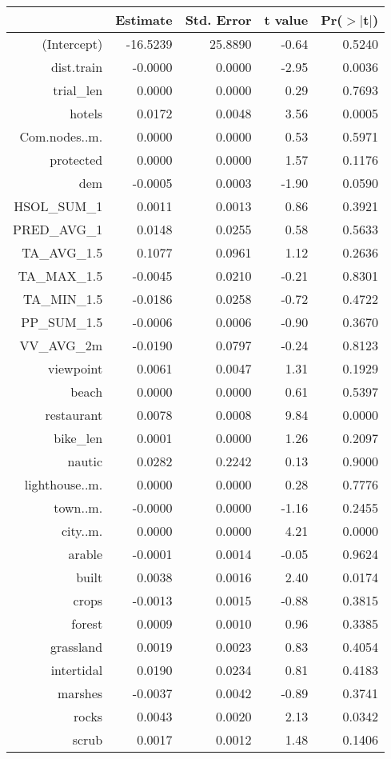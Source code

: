\begin{table}[ht]
\centering
\begin{tabular}{rrrrr}
  \hline
 & Estimate & Std. Error & t value & Pr($>$$|$t$|$) \\ 
  \hline
(Intercept) & -16.5239 & 25.8890 & -0.64 & 0.5240 \\ 
  dist.train & -0.0000 & 0.0000 & -2.95 & 0.0036 \\ 
  trial\_len & 0.0000 & 0.0000 & 0.29 & 0.7693 \\ 
  hotels & 0.0172 & 0.0048 & 3.56 & 0.0005 \\ 
  Com.nodes..m. & 0.0000 & 0.0000 & 0.53 & 0.5971 \\ 
  protected & 0.0000 & 0.0000 & 1.57 & 0.1176 \\ 
  dem & -0.0005 & 0.0003 & -1.90 & 0.0590 \\ 
  HSOL\_SUM\_1 & 0.0011 & 0.0013 & 0.86 & 0.3921 \\ 
  PRED\_AVG\_1 & 0.0148 & 0.0255 & 0.58 & 0.5633 \\ 
  TA\_AVG\_1.5 & 0.1077 & 0.0961 & 1.12 & 0.2636 \\ 
  TA\_MAX\_1.5 & -0.0045 & 0.0210 & -0.21 & 0.8301 \\ 
  TA\_MIN\_1.5 & -0.0186 & 0.0258 & -0.72 & 0.4722 \\ 
  PP\_SUM\_1.5 & -0.0006 & 0.0006 & -0.90 & 0.3670 \\ 
  VV\_AVG\_2m & -0.0190 & 0.0797 & -0.24 & 0.8123 \\ 
  viewpoint & 0.0061 & 0.0047 & 1.31 & 0.1929 \\ 
  beach & 0.0000 & 0.0000 & 0.61 & 0.5397 \\ 
  restaurant & 0.0078 & 0.0008 & 9.84 & 0.0000 \\ 
  bike\_len & 0.0001 & 0.0000 & 1.26 & 0.2097 \\ 
  nautic & 0.0282 & 0.2242 & 0.13 & 0.9000 \\ 
  lighthouse..m. & 0.0000 & 0.0000 & 0.28 & 0.7776 \\ 
  town..m. & -0.0000 & 0.0000 & -1.16 & 0.2455 \\ 
  city..m. & 0.0000 & 0.0000 & 4.21 & 0.0000 \\ 
  arable & -0.0001 & 0.0014 & -0.05 & 0.9624 \\ 
  built & 0.0038 & 0.0016 & 2.40 & 0.0174 \\ 
  crops & -0.0013 & 0.0015 & -0.88 & 0.3815 \\ 
  forest & 0.0009 & 0.0010 & 0.96 & 0.3385 \\ 
  grassland & 0.0019 & 0.0023 & 0.83 & 0.4054 \\ 
  intertidal & 0.0190 & 0.0234 & 0.81 & 0.4183 \\ 
  marshes & -0.0037 & 0.0042 & -0.89 & 0.3741 \\ 
  rocks & 0.0043 & 0.0020 & 2.13 & 0.0342 \\ 
  scrub & 0.0017 & 0.0012 & 1.48 & 0.1406 \\ 
   \hline
\end{tabular}
\end{table}
